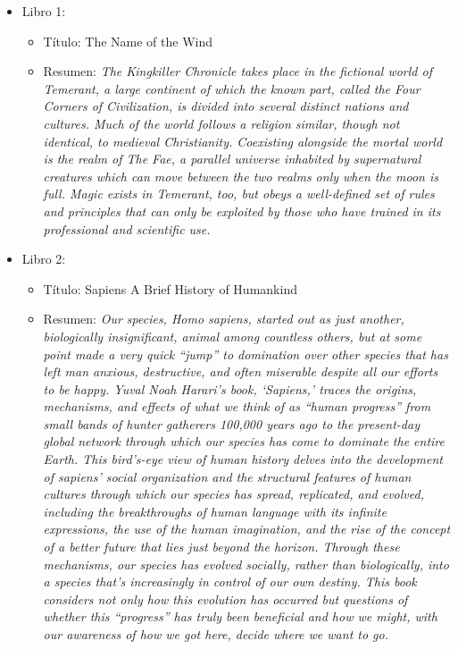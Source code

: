 \documentclass[12pt,a4paper, xcolor=table]{article}
\begin{document}
\begin{itemize}
\item Libro 1:
\begin{itemize}
\item Título: The Name of the Wind
\item Resumen: \textit{The Kingkiller Chronicle takes place in the fictional world of Temerant, a large continent of which the known part, called the Four Corners of Civilization, is divided into several distinct nations and cultures. Much of the world follows a religion similar, though not identical, to medieval Christianity. Coexisting alongside the mortal world is the realm of The Fae, a parallel universe inhabited by supernatural creatures which can move between the two realms only when the moon is full. Magic exists in Temerant, too, but obeys a well-defined set of rules and principles that can only be exploited by those who have trained in its professional and scientific use.}
\end{itemize}
\item Libro 2:
\begin{itemize}
\item Título: Sapiens A Brief History of Humankind
\item Resumen: \textit{Our species, Homo sapiens, started out as just another, biologically insignificant, animal among countless others, but at some point made a very quick “jump” to domination over other species that has left man anxious, destructive, and often miserable despite all our efforts to be happy. Yuval Noah Harari’s book, ‘Sapiens,’ traces the origins, mechanisms, and effects of what we think of as “human progress” from small bands of hunter gatherers 100,000 years ago to the present-day global network through which our species has come to dominate the entire Earth. This bird’s-eye view of human history delves into the development of sapiens’ social organization and the structural features of human cultures through which our species has spread, replicated, and evolved, including the breakthroughs of human language with its infinite expressions, the use of the human imagination, and the rise of the concept of a better future that lies just beyond the horizon. Through these mechanisms, our species has evolved socially, rather than biologically, into a species that’s increasingly in control of our own destiny. This book considers not only how this evolution has occurred but questions of whether this “progress” has truly been beneficial and how we might, with our awareness of how we got here, decide where we want to go.}
\end{itemize}
\end{itemize}
\end{document}
